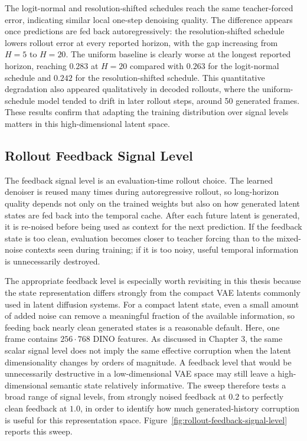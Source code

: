 \documentclass[12pt]{report}
\begin{document}
The logit-normal and resolution-shifted schedules reach the same teacher-forced error, indicating similar local one-step denoising quality. The difference appears once predictions are fed back autoregressively: the resolution-shifted schedule lowers rollout error at every reported horizon, with the gap increasing from $H=5$ to $H=20$. The uniform baseline is clearly worse at the longest reported horizon, reaching $0.283$ at $H=20$ compared with $0.263$ for the logit-normal schedule and $0.242$ for the resolution-shifted schedule. This quantitative degradation also appeared qualitatively in decoded rollouts, where the uniform-schedule model tended to drift in later rollout steps, around 50 generated frames. These results confirm that adapting the training distribution over signal levels matters in this high-dimensional latent space.

\subsection{Rollout Feedback Signal Level}
The feedback signal level is an evaluation-time rollout choice. The learned denoiser is reused many times during autoregressive rollout, so long-horizon quality depends not only on the trained weights but also on how generated latent states are fed back into the temporal cache. After each future latent is generated, it is re-noised before being used as context for the next prediction. If the feedback state is too clean, evaluation becomes closer to teacher forcing than to the mixed-noise contexts seen during training; if it is too noisy, useful temporal information is unnecessarily destroyed.

The appropriate feedback level is especially worth revisiting in this thesis because the state representation differs strongly from the compact VAE latents commonly used in latent diffusion systems. For a compact latent state, even a small amount of added noise can remove a meaningful fraction of the available information, so feeding back nearly clean generated states is a reasonable default. Here, one frame contains $256\cdot768$ DINO features. As discussed in Chapter 3, the same scalar signal level does not imply the same effective corruption when the latent dimensionality changes by orders of magnitude. A feedback level that would be unnecessarily destructive in a low-dimensional VAE space may still leave a high-dimensional semantic state relatively informative. The sweep therefore tests a broad range of signal levels, from strongly noised feedback at $0.2$ to perfectly clean feedback at $1.0$, in order to identify how much generated-history corruption is useful for this representation space. Figure~\ref{fig:rollout-feedback-signal-level} reports this sweep.
\end{document}
